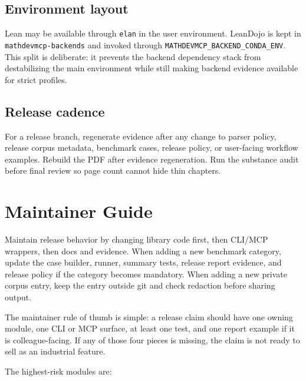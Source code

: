 \documentclass[12pt,a4paper,openany]{book}
\begin{document}
\section{Environment layout}

Lean may be available through \texttt{elan} in the user environment. LeanDojo is
kept in \texttt{mathdevmcp-backends} and invoked through
\texttt{MATHDEVMCP\_BACKEND\_CONDA\_ENV}. This split is deliberate: it prevents
the backend dependency stack from destabilizing the main environment while
still making backend evidence available for strict profiles.

\section{Release cadence}

For a release branch, regenerate evidence after any change to parser policy,
release corpus metadata, benchmark cases, release policy, or user-facing
workflow examples. Rebuild the PDF after evidence regeneration. Run the
substance audit before final review so page count cannot hide thin chapters.

\chapter{Maintainer Guide}

Maintain release behavior by changing library code first, then CLI/MCP wrappers,
then docs and evidence. When adding a new benchmark category, update the case
builder, runner, summary tests, release report evidence, and release policy if
the category becomes mandatory. When adding a new private corpus entry, keep the
entry outside git and check redaction before sharing output.

The maintainer rule of thumb is simple: a release claim should have one owning
module, one CLI or MCP surface, at least one test, and one report example if it
is colleague-facing. If any of those four pieces is missing, the claim is not
ready to sell as an industrial feature.

The highest-risk modules are:
\end{document}
